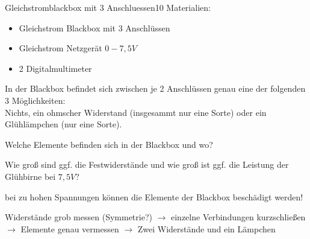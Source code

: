 \begin{problem}{Gleichstromblackbox mit 3 Anschluessen}{10}
Materialien:
\begin{itemize}
\item Gleichstrom Blackbox mit 3 Anschlüssen
\item Gleichstrom Netzgerät $0-7,5\unit{V}$
\item 2 Digitalmultimeter
\end{itemize}
In der Blackbox befindet sich zwischen je 2 Anschlüssen genau eine der folgenden 3 Möglichkeiten:\\ Nichts, ein ohmscher Widerstand (insgesammt nur eine Sorte) oder ein Glühlämpchen (nur eine Sorte).
\begin{abcenum}
\item Welche Elemente befinden sich in der Blackbox und wo?
\item Wie groß sind ggf. die Festwiderstände und wie groß ist ggf. die Leistung der Glühbirne bei $7,5\unit{V}$?
\end{abcenum}
\hinweis bei zu hohen Spannungen können die Elemente der Blackbox beschädigt werden!
\begin{expsolution}
Widerstände grob messen (Symmetrie?) $\rightarrow$ einzelne Verbindungen kurzschließen $\rightarrow$ Elemente genau vermessen $\rightarrow$ Zwei Widerstände und ein Lämpchen
\end{expsolution}
\end{problem}

